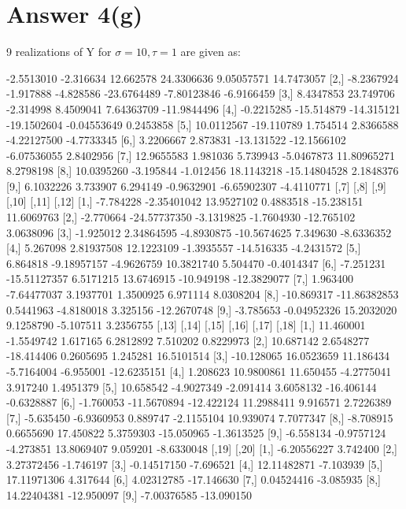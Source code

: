 \documentclass[12pt]{article}
\begin{document}
\clearpage
\section*{Answer 4(g)}

9 realizations of Y for $\sigma=10, \tau=1$ are given as:
\begin{Schunk}
\begin{Soutput}
            [,1]       [,2]       [,3]        [,4]         [,5]        [,6]
 [1,] -2.5513010  -2.316634  12.662578  24.3306636   9.05057571  14.7473057
 [2,] -8.2367924  -1.917888  -4.828586 -23.6764489  -7.80123846  -6.9166459
 [3,]  8.4347853  23.749706  -2.314998   8.4509041   7.64363709 -11.9844496
 [4,] -0.2215285 -15.514879 -14.315121 -19.1502604  -0.04553649   0.2453858
 [5,] 10.0112567 -19.110789   1.754514   2.8366588  -4.22127500  -4.7733345
 [6,]  3.2206667   2.873831 -13.131522 -12.1566102  -6.07536055   2.8402956
 [7,] 12.9655583   1.981036   5.739943  -5.0467873  11.80965271   8.2798198
 [8,] 10.0395260  -3.195844  -1.012456  18.1143218 -15.14804528   2.1848376
 [9,]  6.1032226   3.733907   6.294149  -0.9632901  -6.65902307  -4.4110771
            [,7]         [,8]       [,9]       [,10]      [,11]       [,12]
 [1,]  -7.784228  -2.35401042 13.9527102   0.4883518 -15.238151  11.6069763
 [2,]  -2.770664 -24.57737350 -3.1319825  -1.7604930 -12.765102   3.0638096
 [3,]  -1.925012   2.34864595 -4.8930875 -10.5674625   7.349630  -8.6336352
 [4,]   5.267098   2.81937508 12.1223109  -1.3935557 -14.516335  -4.2431572
 [5,]   6.864818  -9.18957157 -4.9626759  10.3821740   5.504470  -0.4014347
 [6,]  -7.251231 -15.51127357  6.5171215  13.6746915 -10.949198 -12.3829077
 [7,]   1.963400  -7.64477037  3.1937701   1.3500925   6.971114   8.0308204
 [8,] -10.869317 -11.86382853  0.5441963  -4.8180018   3.325156 -12.2670748
 [9,]  -3.785653  -0.04952326 15.2032020   9.1258790  -5.107511   3.2356755
           [,13]       [,14]      [,15]      [,16]      [,17]       [,18]
 [1,]  11.460001  -1.5549742   1.617165  6.2812892   7.510202   0.8229973
 [2,]  10.687142   2.6548277 -18.414406  0.2605695   1.245281  16.5101514
 [3,] -10.128065  16.0523659  11.186434 -5.7164004  -6.955001 -12.6235151
 [4,]   1.208623  10.9800861  11.650455 -4.2775041   3.917240   1.4951379
 [5,]  10.658542  -4.9027349  -2.091414  3.6058132 -16.406144  -0.6328887
 [6,]  -1.760053 -11.5670894 -12.422124 11.2988411   9.916571   2.7226389
 [7,]  -5.635450  -6.9360953   0.889747 -2.1155104  10.939074   7.7077347
 [8,]  -8.708915   0.6655690  17.450822  5.3759303 -15.050965  -1.3613525
 [9,]  -6.558134  -0.9757124  -4.273851 13.8069407   9.059201  -8.6330048
            [,19]      [,20]
 [1,] -6.20556227   3.742400
 [2,]  3.27372456  -1.746197
 [3,] -0.14517150  -7.696521
 [4,] 12.11482871  -7.103939
 [5,] 17.11971306   4.317644
 [6,]  4.02312785 -17.146630
 [7,]  0.04524416  -3.085935
 [8,] 14.22404381 -12.950097
 [9,] -7.00376585 -13.090150
\end{Soutput}
\end{Schunk}
\end{document}
